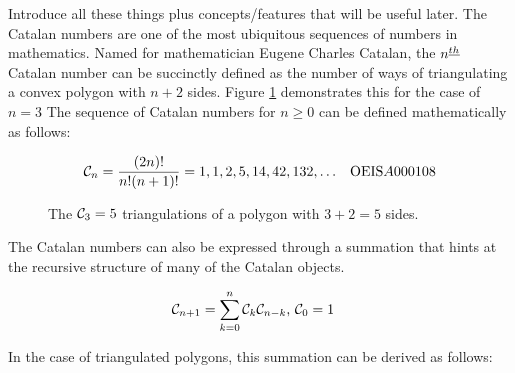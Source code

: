 Introduce all these things plus concepts/features that will be useful later.
The Catalan numbers are one of the most ubiquitous sequences of numbers in mathematics.  
Named for mathematician Eugene Charles Catalan, the $n^{\underline{th}}$ Catalan number can be succinctly defined as the number of ways of triangulating a convex polygon with $n+2$ sides.  Figure \ref{fig:pentagontriangulations} demonstrates this for the case of $n=3$ The sequence of Catalan numbers for $n \ge 0$ can be defined mathematically as follows:

\begin{align}
    \mathcal{C}_n &= \frac{(2n)!}{n!(n+1)!} =1, 1, 2, 5, 14, 42, 132, \ldots & \text{OEIS} A000108
\end{align}

\begin{figure}
\begin{center}
\end{center}
    \caption{The $\mathcal{C}_3=5$ triangulations of a polygon with $3+2=5$ sides.}
\label{fig:pentagontriangulations}
\end{figure}
The Catalan numbers can also be expressed through a summation that hints at the recursive structure of many of the Catalan objects.  

\begin{align}
    \mathcal{C}_{n+1} &= \sum_{k=0}^{n}{\mathcal{C}_{k}\mathcal{C}_{n-k}} \textrm{,   }  \mathcal{C}_0=1
\end{align} 

In the case of triangulated polygons, this summation can be derived as follows:

